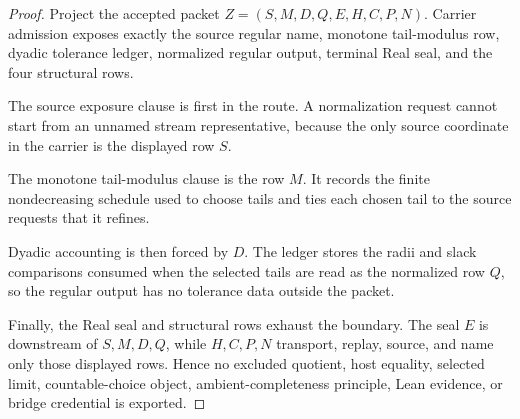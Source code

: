 \begin{proof}
Project the accepted packet $Z=(S,M,D,Q,E,H,C,P,N)$. Carrier admission exposes exactly the source regular name, monotone tail-modulus row, dyadic tolerance ledger, normalized regular output, terminal Real seal, and the four structural rows.

The source exposure clause is first in the route. A normalization request cannot start from an unnamed stream representative, because the only source coordinate in the carrier is the displayed row $S$.

The monotone tail-modulus clause is the row $M$. It records the finite nondecreasing schedule used to choose tails and ties each chosen tail to the source requests that it refines.

Dyadic accounting is then forced by $D$. The ledger stores the radii and slack comparisons consumed when the selected tails are read as the normalized row $Q$, so the regular output has no tolerance data outside the packet.

Finally, the Real seal and structural rows exhaust the boundary. The seal $E$ is downstream of $S,M,D,Q$, while $H,C,P,N$ transport, replay, source, and name only those displayed rows. Hence no excluded quotient, host equality, selected limit, countable-choice object, ambient-completeness principle, Lean evidence, or bridge credential is exported.
\end{proof}

